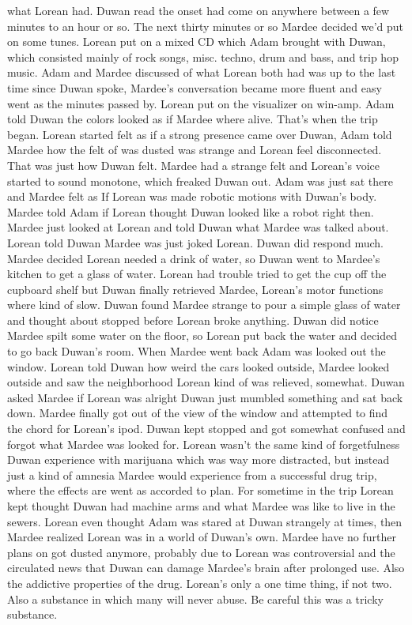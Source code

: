 \documentclass[12pt]{book}
\begin{document}
what Lorean had. Duwan read the onset had come on anywhere between a few minutes to an hour or so. The next thirty minutes or so Mardee decided we'd put on some tunes. Lorean put on a mixed CD which Adam brought with Duwan, which consisted mainly of rock songs, misc. techno, drum and bass, and trip hop music. Adam and Mardee discussed of what Lorean both had was up to the last time since Duwan spoke, Mardee's conversation became more fluent and easy went as the minutes passed by. Lorean put on the visualizer on win-amp. Adam told Duwan the colors looked as if Mardee where alive. That's when the trip began. Lorean started felt as if a strong presence came over Duwan, Adam told Mardee how the felt of was dusted was strange and Lorean feel disconnected. That was just how Duwan felt. Mardee had a strange felt and Lorean's voice started to sound monotone, which freaked Duwan out. Adam was just sat there and Mardee felt as If Lorean was made robotic motions with Duwan's body. Mardee told Adam if Lorean thought Duwan looked like a robot right then. Mardee just looked at Lorean and told Duwan what Mardee was talked about. Lorean told Duwan Mardee was just joked Lorean. Duwan did respond much. Mardee decided Lorean needed a drink of water, so Duwan went to Mardee's kitchen to get a glass of water. Lorean had trouble tried to get the cup off the cupboard shelf but Duwan finally retrieved Mardee, Lorean's motor functions where kind of slow. Duwan found Mardee strange to pour a simple glass of water and thought about stopped before Lorean broke anything. Duwan did notice Mardee spilt some water on the floor, so Lorean put back the water and decided to go back Duwan's room. When Mardee went back Adam was looked out the window. Lorean told Duwan how weird the cars looked outside, Mardee looked outside and saw the neighborhood Lorean kind of was relieved, somewhat. Duwan asked Mardee if Lorean was alright Duwan just mumbled something and sat back down. Mardee finally got out of the view of the window and attempted to find the chord for Lorean's ipod. Duwan kept stopped and got somewhat confused and forgot what Mardee was looked for. Lorean wasn't the same kind of forgetfulness Duwan experience with marijuana which was way more distracted, but instead just a kind of amnesia Mardee would experience from a successful drug trip, where the effects are went as accorded to plan. For sometime in the trip Lorean kept thought Duwan had machine arms and what Mardee was like to live in the sewers. Lorean even thought Adam was stared at Duwan strangely at times, then Mardee realized Lorean was in a world of Duwan's own. Mardee have no further plans on got dusted anymore, probably due to Lorean was controversial and the circulated news that Duwan can damage Mardee's brain after prolonged use. Also the addictive properties of the drug. Lorean's only a one time thing, if not two. Also a substance in which many will never abuse. Be careful this was a tricky substance.
\end{document}
